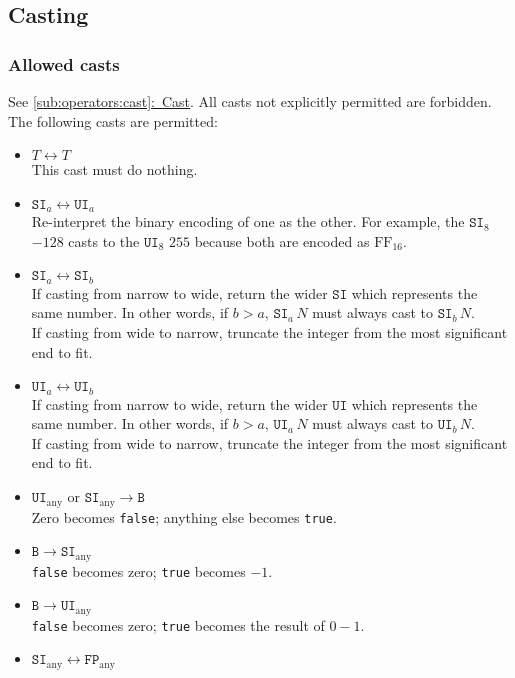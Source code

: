 \documentclass{article}
\newcommand{\R}[1]{\mathtt{#1}}
\newcommand{\both}{\leftrightarrow}
\newcommand{\textref}[2]{\hyperref[#1]{\underline{\ref*{#1}:~#2}}}
\begin{document}
\subsection{Casting}
\label{sub:types:casting}
\subsubsection{Allowed casts}
See \textref{sub:operators:cast}{Cast}.
All casts not explicitly permitted are forbidden. The following casts are
permitted:
\begin{itemize}
  \item{$T \both T$ \\
    This cast must do nothing.}
  \item{$\R{SI}_a \both \R{UI}_a$ \\
    Re-interpret the binary encoding of one as the other. For example,
    the $\R{SI}_8$ $-128$ casts to the $\R{UI}_8$ $255$ because both are
    encoded as $\mathrm{FF}_{16}$.}
  \item{$\R{SI}_a \both \R{SI}_b$ \\
    If casting from narrow to wide, return the wider $\R{SI}$ which represents
    the same number. In other words, if $b > a$, $\R{SI}_a\,N$ must always cast
    to $\R{SI}_b\,N$. \\
    If casting from wide to narrow, truncate the integer from the most
    significant end to fit.}
  \item{$\R{UI}_a \both \R{UI}_b$ \\
    If casting from narrow to wide, return the wider $\R{UI}$ which represents
    the same number. In other words, if $b > a$, $\R{UI}_a\,N$ must always cast
    to $\R{UI}_b\,N$. \\
    If casting from wide to narrow, truncate the integer from the most
    significant end to fit.}
  \item{$\R{UI}_\mathrm{any} \textrm{ or } \R{SI}_\mathrm{any} \to \R{B}$ \\
    Zero becomes \texttt{false}; anything else becomes \texttt{true}.}
  \item{$\R{B} \to \R{SI}_\mathrm{any}$ \\
    \texttt{false} becomes zero; \texttt{true} becomes $-1$.}
  \item{$\R{B} \to \R{UI}_\mathrm{any}$ \\
    \texttt{false} becomes zero; \texttt{true} becomes the result of $0 - 1$.}
  \item{$\R{SI}_\mathrm{any} \both \R{FP}_\mathrm{any}$ \\
}
\end{itemize}
\end{document}
